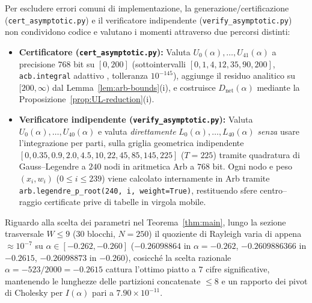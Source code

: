 \documentclass[11pt, reqno]{amsart}
\theoremstyle{remark}
\numberwithin{equation}{section}
\begin{document}
Per escludere errori comuni di implementazione, la generazione/certificazione (\texttt{cert\_asymptotic.py})
e il verificatore indipendente (\texttt{verify\_asymptotic.py}) non condividono codice e valutano i momenti
attraverso due percorsi distinti:
\begin{itemize}
\item \textbf{Certificatore (\texttt{cert\_asymptotic.py}):} Valuta $U_0(\alpha),\dots,U_{41}(\alpha)$
a precisione $768$ bit su $[0, 200]$ (sottointervalli $[0,1,4,12,35,90,200]$, \texttt{acb.integral} adattivo
\cite{JohanssonArb}, tolleranza $10^{-145}$), aggiunge il residuo analitico su $[200,\infty)$ dal
Lemma~\ref{lem:arb-bounds}(i), e costruisce $D_{\mathrm{net}}(\alpha)$ mediante la Proposizione~\ref{prop:UL-reduction}(i).
\item \textbf{Verificatore indipendente (\texttt{verify\_asymptotic.py}):} Valuta $U_0(\alpha),\dots,U_{40}(\alpha)$
e valuta \emph{direttamente} $L_0(\alpha),\dots,L_{40}(\alpha)$ \emph{senza} usare l'integrazione per parti,
sulla griglia geometrica indipendente $[0, 0.35, 0.9, 2.0, 4.5, 10, 22, 45, 85, 145, 225]$ ($T = 225$) tramite
quadratura di Gauss--Legendre a $240$ nodi in aritmetica Arb a $768$ bit. Ogni nodo e peso $(x_i, w_i)$
($0 \le i \le 239$) viene calcolato internamente in Arb tramite \texttt{arb.legendre\_p\_root(240, i, weight=True)},
restituendo sfere centro--raggio certificate prive di tabelle in virgola mobile.
\end{itemize}

Riguardo alla scelta dei parametri nel Teorema~\ref{thm:main}, lungo la sezione trasversale $W \le 9$
($30$ blocchi, $N = 250$) il quoziente di Rayleigh varia di appena $\approx 10^{-7}$ su
$\alpha \in [-0.262, -0.260]$ ($-0.26098864$ in $\alpha = -0.262$, $-0.2609886366$ in $-0.2615$,
$-0.26098873$ in $-0.260$), cosicché la scelta razionale $\alpha = -523/2000 = -0.2615$ cattura
l'ottimo piatto a $7$ cifre significative, mantenendo le lunghezze delle partizioni concatenate $\le 8$
e un rapporto dei pivot di Cholesky per $I(\alpha)$ pari a $7.90 \times 10^{-11}$.
\end{document}
